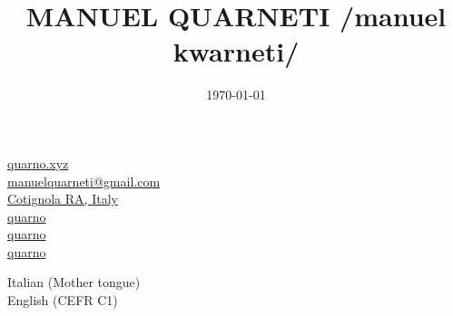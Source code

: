 \documentclass{article}
\title{\HUGE \textbf{MANUEL QUARNETI} \linebreak \huge \color{gray} /manuel kwarneti/ \\[-20pt]}
\author{}
\date{\today}
\begin{document}
\setmainfont{Inter}

\setlength{\columnsep}{20pt}
\begin{paracol}{2}

\begin{tcolorbox}[colback=white,arc=0pt]
    \vspace{10pt}

    \begin{center}
    \end{center}

    \vspace{0pt}

    \tcblower

    \href{https://quarno.xyz/}{ quarno.xyz} \\[8pt]
    \href{mailto:manuelquarneti@gmail.com}{ manuelquarneti@gmail.com} \\[8pt]
    \href{https://www.openstreetmap.org/relation/43112}{ Cotignola RA, Italy} \\[8pt]
    \href{https://github.com/quarno}{ quarno} \\[8pt]
    \href{https://www.linkedin.com/in/quarno}{ quarno} \\[8pt]
    \href{https://t.me/quarno}{ quarno}
\end{tcolorbox}

\vspace{35pt}

\begin{tcolorbox}[title=\emoji{speaking-head} Languages,colback=white,arc=0pt]
     Italian (Mother tongue) \\[4pt]
     English (CEFR C1)
\end{tcolorbox}


\end{paracol}
\end{document}
